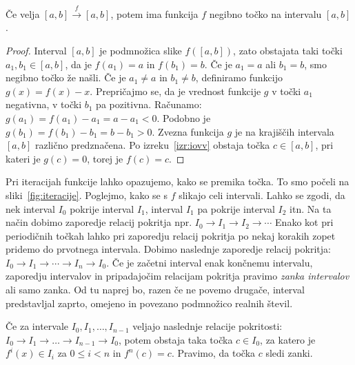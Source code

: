 \documentclass[mat2]{fmfdelo}
\begin{document}
\begin{lema}\label{lem:1zanka}
Če velja $[a, b] \xrightarrow{f} [a, b]$, potem ima funkcija $f$ negibno točko na intervalu $[a, b]$.
\end{lema}
\begin{proof}
Interval $[a, b]$ je podmnožica slike $f([a, b])$, zato obstajata taki točki $a_1, b_1 \in [a, b]$, da je $f(a_1)=a$ in $f(b_1)=b$. Če je $a_1 = a$ ali $b_1 = b$, smo negibno točko že našli. Če je $a_1 \neq a$ in $b_1 \neq b$, definiramo funkcijo $g(x) = f(x) - x$. Prepričajmo se, da je vrednost funkcije $g$ v točki $a_1$ negativna, v točki $b_1$ pa pozitivna. Računamo:
$g(a_1) = f(a_1) - a_1 = a - a_1 < 0$. Podobno je
$g(b_1) = f(b_1) - b_1 = b - b_1 > 0$.
Zvezna funkcija $g$ je na krajiščih intervala $[a, b]$ različno predznačena. Po izreku~\ref{izr:iovv} obstaja točka $c \in [a, b]$, pri kateri je $g(c)=0$, torej je $f(c) = c$.
\end{proof}
Pri iteracijah funkcije lahko opazujemo, kako se premika točka. To smo počeli na sliki~\ref{fig:iteracije}. Poglejmo, kako se s $f$ slikajo celi intervali. Lahko se zgodi, da nek interval $I_0$ pokrije interval $I_1$, interval $I_1$ pa pokrije interval $I_2$ itn. Na ta način dobimo zaporedje relacij pokritja npr. $I_0 \to I_1 \to I_2 \to \cdots $ Enako kot pri periodičnih točkah lahko pri zaporedju relacij pokritja po nekaj korakih zopet pridemo do prvotnega intervala. Dobimo naslednje zaporedje relacij pokritja: $I_0 \to I_1 \to \cdots \to I_n \to I_0$. Če je začetni interval enak končnemu intervalu, zaporedju intervalov in pripadajočim relacijam pokritja pravimo \emph{zanka intervalov} ali samo zanka. Od tu naprej bo, razen če ne povemo drugače, interval predstavljal zaprto, omejeno in povezano podmnožico realnih števil.

\begin{lema}\label{lem:zanka}
Če za intervale $I_0, I_1, \dots, I_{n-1}$ veljajo naslednje relacije pokritosti: $I_0 \to I_1 \to \dots \to I_{n-1} \to I_0$, potem obstaja taka točka $c \in I_0$, za katero je $f^{i}(x) \in I_i$ za $0 \leq i < n$ in $f^n(c)=c$. Pravimo, da točka $c$ sledi zanki.
\end{lema}
\end{document}
